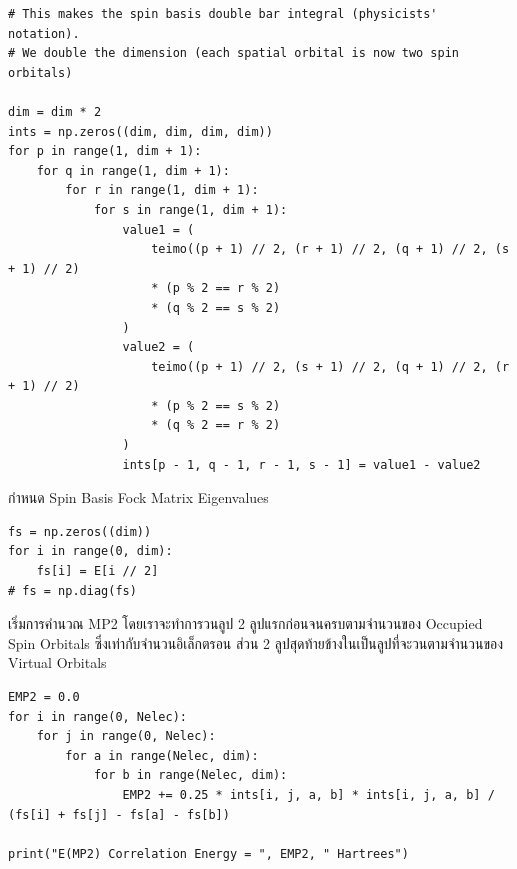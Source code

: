 \begin{lstlisting}[style=MyPython]
# This makes the spin basis double bar integral (physicists' notation).
# We double the dimension (each spatial orbital is now two spin orbitals)

dim = dim * 2
ints = np.zeros((dim, dim, dim, dim))
for p in range(1, dim + 1):
    for q in range(1, dim + 1):
        for r in range(1, dim + 1):
            for s in range(1, dim + 1):
                value1 = (
                    teimo((p + 1) // 2, (r + 1) // 2, (q + 1) // 2, (s + 1) // 2)
                    * (p % 2 == r % 2)
                    * (q % 2 == s % 2)
                )
                value2 = (
                    teimo((p + 1) // 2, (s + 1) // 2, (q + 1) // 2, (r + 1) // 2)
                    * (p % 2 == s % 2)
                    * (q % 2 == r % 2)
                )
                ints[p - 1, q - 1, r - 1, s - 1] = value1 - value2
\end{lstlisting}

\vspace{5pt}

\noindent กำหนด Spin Basis Fock Matrix Eigenvalues

\vspace{5pt}

\begin{lstlisting}[style=MyPython]
fs = np.zeros((dim))
for i in range(0, dim):
    fs[i] = E[i // 2]
# fs = np.diag(fs)
\end{lstlisting}

\vspace{5pt}

\noindent เริ่มการคำนวณ MP2 โดยเราจะทำการวนลูป 2 ลูปแรกก่อนจนครบตามจำนวนของ Occupied Spin Orbitals ซึ่งเท่ากับจำนวนอิเล็กตรอน
ส่วน 2 ลูปสุดท้ายข้างในเป็นลูปที่จะวนตามจำนวนของ Virtual Orbitals

\vspace{5pt}

\begin{lstlisting}[style=MyPython]
EMP2 = 0.0
for i in range(0, Nelec):
    for j in range(0, Nelec):
        for a in range(Nelec, dim):
            for b in range(Nelec, dim):
                EMP2 += 0.25 * ints[i, j, a, b] * ints[i, j, a, b] / (fs[i] + fs[j] - fs[a] - fs[b])

print("E(MP2) Correlation Energy = ", EMP2, " Hartrees")
\end{lstlisting}

\vspace{5pt}


